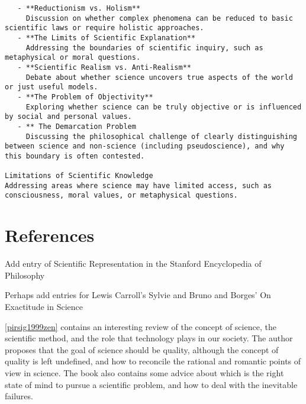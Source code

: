 \begin{verbatim}
   - **Reductionism vs. Holism**  
     Discussion on whether complex phenomena can be reduced to basic scientific laws or require holistic approaches.
   - **The Limits of Scientific Explanation**  
     Addressing the boundaries of scientific inquiry, such as metaphysical or moral questions.
   - **Scientific Realism vs. Anti-Realism**  
     Debate about whether science uncovers true aspects of the world or just useful models.
   - **The Problem of Objectivity**  
     Exploring whether science can be truly objective or is influenced by social and personal values.
   - ** The Demarcation Problem
     Discussing the philosophical challenge of clearly distinguishing between science and non-science (including pseudoscience), and why this boundary is often contested.

Limitations of Scientific Knowledge
Addressing areas where science may have limited access, such as consciousness, moral values, or metaphysical questions.

\end{verbatim}


%
%

\section*{References}

{\color{red} Add entry of Scientific Representation in the Stanford Encyclopedia of Philosophy}

{\color{red} Perhaps add entries for Lewis Carroll's Sylvie and Bruno and Borges' On Exactitude in Science}

\ref{pirsig1999zen} contains an interesting review of the concept of science, the scientific method, and the role that technology plays in our society. The author proposes that the goal of science should be quality, although the concept of quality is left undefined, and how to reconcile the rational and romantic points of view in science. The book also contains some advice about which is the right state of mind to pursue a scientific problem, and how to deal with the inevitable failures.


